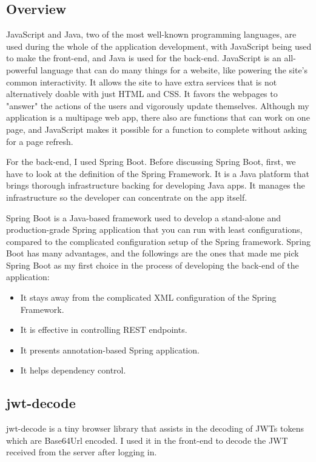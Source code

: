 \documentclass[a4paper, 11pt,openany]{book} %
\begin{document}
\subsection{Overview}
JavaScript and Java, two of the most well-known programming languages, are used during the whole of the application development, with JavaScript being used to make the front-end, and Java is used for the back-end. JavaScript is an all-powerful language that can do many things for a website, like powering the site's common interactivity. It allows the site to have extra services that is not alternatively doable with just HTML and CSS. It favors the webpages to "answer" the actions of the users and vigorously update themselves. Although my application is a multipage web app, there also are functions that can work on one page, and JavaScript makes it possible for a function to complete without asking for a page refresh.\cite{js2} \par
For the back-end, I used Spring Boot. Before discussing Spring Boot, first, we have to look at the definition of the Spring Framework. It is a Java platform that brings thorough infrastructure backing for developing Java apps. It manages the infrastructure so the developer can concentrate on the app itself.\cite{spring} \par
Spring Boot is a Java-based framework used to develop a stand-alone and production-grade Spring application that you can run with least configurations, compared to the complicated configuration setup of the Spring framework.
Spring Boot has many advantages, and the followings are the ones that made me pick Spring Boot as my first choice in the process of developing the back-end of the application:
\begin{itemize}
    \item It stays away from the complicated XML configuration of the Spring Framework.
    \item It is effective in controlling REST endpoints.
    \item It presents annotation-based Spring application.
    \item It helps dependency control.\cite{springboot}
\end{itemize}

\subsection{jwt-decode}
jwt-decode is a tiny browser library that assists in the decoding of JWTs tokens which are Base64Url encoded.\cite{jwtdecode} I used it in the front-end to decode the JWT received from the server after logging in.
\end{document}
